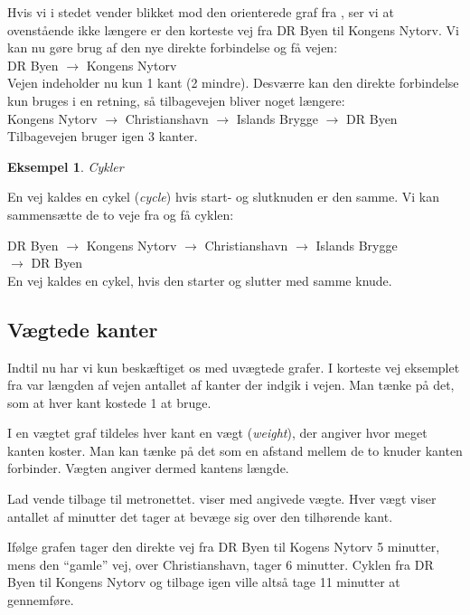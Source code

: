 \documentclass[10pt,a4paper,danish]{article}
\newtheorem{example}{Eksempel}[subsection]
\begin{document}
Hvis vi i stedet vender blikket mod den orienterede graf fra
, ser vi at ovenstående ikke længere er den korteste
vej fra DR Byen til Kongens Nytorv. Vi kan nu gøre brug af den nye
direkte forbindelse og få vejen:\\\indent
DR Byen $\to$ Kongens Nytorv
\\

Vejen indeholder nu kun 1 kant (2 mindre). Desværre kan den direkte
forbindelse kun bruges i en retning, så tilbagevejen bliver noget
længere:\\\indent
Kongens Nytorv $\to$ Christianshavn $\to$ Islands Brygge $\to$
DR Byen\\

Tilbagevejen bruger igen 3 kanter.

\begin{example}Cykler\end{example} En vej kaldes en cykel
(\textit{cycle}) hvis start- og slutknuden er den samme. Vi kan
sammensætte de to veje fra  og få cyklen:\\\indent

DR Byen $\to$ Kongens Nytorv $\to$ Christianshavn $\to$ Islands Brygge
\\\indent $\to$ DR Byen\\

En vej kaldes en cykel, hvis den starter og slutter med samme
knude.


\subsection{Vægtede kanter}
Indtil nu har vi kun beskæftiget os med uvægtede grafer. I korteste
vej eksemplet fra  var længden af vejen antallet af
kanter der indgik i vejen. Man tænke på det, som at hver kant
kostede 1 at bruge.

I en vægtet graf tildeles hver kant en vægt (\textit{weight}), der
angiver hvor meget kanten koster. Man kan tænke på det som en
afstand mellem de to knuder kanten forbinder. Vægten angiver dermed
kantens længde.

Lad vende tilbage til metronettet.  viser
 med angivede vægte. Hver vægt viser antallet af
minutter det tager at bevæge sig over den tilhørende kant.

Ifølge grafen tager den direkte vej fra DR Byen til Kogens Nytorv
5 minutter, mens den "`gamle"' vej, over Christianshavn, tager 6
minutter. Cyklen fra DR Byen til Kongens Nytorv og tilbage igen ville
altså tage 11 minutter at gennemføre.
\end{document}
